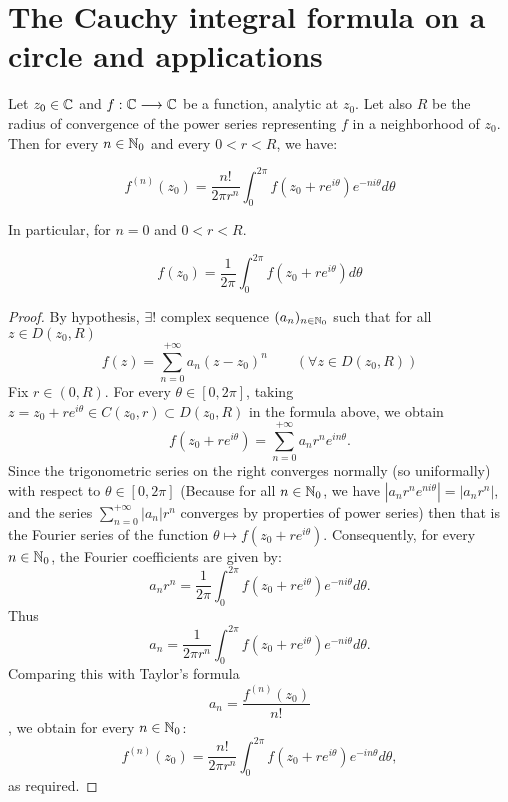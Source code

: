 \chapter{The Cauchy integral formula on a circle and applications}
\begin{theorem}[]
Let $z_0 \in   \mathbb{C} $ and $ f : \mathbb{C}  \longrightarrow \mathbb{C}  $ be
a function, analytic at $z_0$. Let also $R$ be the radius
of convergence of the power series representing $f$ 
in a neighborhood of $z_0$. Then for every 
$n \in  \mathbb{N}_0$ and every $ 0 <  r <  R$, we have:
\begin{center}
\begin{tcolorbox}[boxrule=1pt, colback=larratBicep!60, sharp corners, width=7cm, height=2cm, top=-0.1cm]
\[
f^{(n) }(z_0)  = 
\frac{n!}{2 \pi  r^n }
\int_{0}^{2\pi } 
f(z_0 + r e^{i \theta}) 
e^{-n i \theta} d\theta
\]
\end{tcolorbox}
\end{center}
In particular, for $n = 0$ and $0 <  r <  R$.
\begin{center}
\begin{tcolorbox}[boxrule=1pt, colback=larratBicep!60, sharp corners, width=7cm, height=2cm, top=-0.1cm]
\[
  f(z_0)  = 
  \frac{1}{2\pi }
  \int_{0}^{2\pi } 
  f(z_0 + r e^{i \theta}) d \theta
\]
\end{tcolorbox}
\end{center}
\end{theorem}
\begin{proof}
By hypothesis, $\exists !$ complex sequence $(a_n ) _{n \in  \mathbb{N}_0}$ such that for all $z \in  D(z_0, R) $ 
\[
f(z)  = 
\sum_{n=0}^{+\infty} a_n (z-z_0) ^n \quad \quad (\forall  z \in   D(z_0, R)) 
\]
Fix $r \in  (0, R) $. For every $\theta \in   \left[ 0, 2\pi  \right]$, taking $z = z_0 + r e^{i \theta} \in  
C(z_0, r)  \subset D(z_0, R) $ in the formula above, we obtain
\[
f(z_0 + r e^{i \theta}) = 
\sum_{n=0}^{+\infty} a_n r^n e^{i n \theta}.
\]
Since the trigonometric series on the right converges normally (so uniformally) with respect
to $\theta \in   \left[ 0, 2\pi  \right]$ (Because for all $n \in  \mathbb{N}_0$, we have
  $
\left| a_n  r^n  e^{n i \theta} \right|  =
\left| a_n r^n  \right|  
  $, and the series $\sum_{n=0}^{+\infty} \left| a_n  \right|  r^n $ converges by properties of power series) then that is
  the Fourier series of the function $\theta \mapsto f(z_0 + r e^{i \theta}) $. Consequently, for 
  every $n \in  \mathbb{N}_0$, the Fourier coefficients are given by:
  \[
  a_n r^n  = \frac{1}{2\pi }
  \int_{0}^{2\pi } f(z_0 + r e^{i \theta}) e^{-n i \theta} d \theta .
  \]
  Thus 
  \[
  a_n = \frac{1}{2\pi r^n }
  \int_{0}^{2\pi } 
  f(z_0 + r e^{i\theta})  e^{-ni\theta}d\theta.
  \]
  Comparing this with Taylor's formula 
  \[
    a_n  = \frac{f^{(n) } (z_0) }{n!}
  \]
  , we obtain for every $n \in  \mathbb{N}_0$:
  \[
  f^{(n) }(z_0)  = 
  \frac{n!}{2 \pi  r^n }\int_{0}^{2\pi } 
  f(z_0 + r e^{i \theta}) e^{-in \theta}d \theta,
  \]
  as required.
\end{proof}
